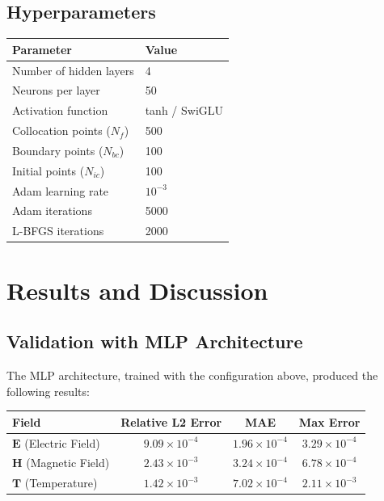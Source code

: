 \documentclass[11pt,a4paper]{article}
\begin{document}
\subsection{Hyperparameters}

\begin{center}
\begin{tabular}{@{}ll@{}}
\toprule
\textbf{Parameter} & \textbf{Value} \\
\midrule
Number of hidden layers & 4 \\
Neurons per layer & 50 \\
Activation function & tanh / SwiGLU \\
Collocation points ($N_f$) & 500 \\
Boundary points ($N_{bc}$) & 100 \\
Initial points ($N_{ic}$) & 100 \\
Adam learning rate & $10^{-3}$ \\
Adam iterations & 5000 \\
L-BFGS iterations & 2000 \\
\bottomrule
\end{tabular}
\end{center}

\section{Results and Discussion}

\subsection{Validation with MLP Architecture}

The MLP architecture, trained with the configuration above, produced the following results:

\begin{center}
\begin{tabular}{@{}lccc@{}}
\toprule
\textbf{Field} & \textbf{Relative L2 Error} & \textbf{MAE} & \textbf{Max Error} \\
\midrule
$\mathbf{E}$ (Electric Field) & $9.09 \times 10^{-4}$ & $1.96 \times 10^{-4}$ & $3.29 \times 10^{-4}$ \\
$\mathbf{H}$ (Magnetic Field) & $2.43 \times 10^{-3}$ & $3.24 \times 10^{-4}$ & $6.78 \times 10^{-4}$ \\
$\mathbf{T}$ (Temperature) & $1.42 \times 10^{-3}$ & $7.02 \times 10^{-4}$ & $2.11 \times 10^{-3}$ \\
\bottomrule
\end{tabular}
\end{center}
\end{document}
